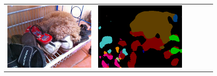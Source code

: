 \documentclass[10pt,twocolumn,letterpaper]{article}
\begin{document}
\begin{figure}
  \centering
  \begin{tabular}{c c c c c c}
   \includegraphics[height=0.1\linewidth]{fig/coco/img/COCO_val2014_000000000042.jpg} &
   \includegraphics[height=0.1\linewidth]{fig/coco/res_baseline/COCO_val2014_000000000042.png} &

\end{tabular}
\end{figure}
\end{document}
